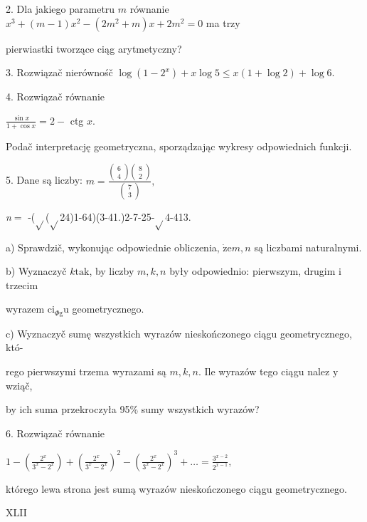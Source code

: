 \documentclass[a4paper,12pt]{article}
\begin{document}
2. Dla jakiego parametru $m$ równanie $x^{3}+(m-1)x^{2}-(2m^{2}+m)x+2m^{2}=0$ ma trzy

pierwiastki tworzące ciąg arytmetyczny?

3. Rozwiązač nierównośč $\log(1-2^{x})+x\log 5\leq x(1+\log 2)+\log 6.$

4. Rozwiązač równanie

$\displaystyle \frac{\sin x}{1+\cos x}=2-$ ctg $x.$

Podač interpretację geometryczna, sporządzając wykresy odpowiednich funkcji.

5. Dane są liczby: $m=\displaystyle \frac{\left(\begin{array}{l}
6\\
4
\end{array}\right)\left(\begin{array}{l}
8\\
2
\end{array}\right)}{\left(\begin{array}{l}
7\\
3
\end{array}\right)},$

{\it n}$=$ -($\sqrt{}$($\sqrt{}$24)1-64)(3-41.)2-7-25-$\sqrt{}$4-413.

a) Sprawdzič, wykonując odpowiednie obliczenia, $\dot{\mathrm{z}}\mathrm{e}m, n$ są liczbami naturalnymi.

b) Wyznaczyč $k\mathrm{t}\mathrm{a}\mathrm{k}$, by liczby $m, k, n$ były odpowiednio: pierwszym, drugim $\mathrm{i}$ trzecim

wyrazem $\mathrm{c}\mathrm{i}_{\Phi \mathrm{g}}\mathrm{u}$ geometrycznego.

c) Wyznaczyč sumę wszystkich wyrazów nieskończonego ciągu geometrycznego, któ-

rego pierwszymi trzema wyrazami są $m, k, n$. Ile wyrazów tego ciągu nalez $\mathrm{y}$ wziąč,

by ich suma przekroczyła 95\% sumy wszystkich wyrazów?

6. Rozwiązač równanie

$1-(\displaystyle \frac{2^{x}}{3^{x}-2^{x}})+(\frac{2^{x}}{3^{x}-2^{x}})^{2}-(\frac{2^{x}}{3^{x}-2^{x}})^{3}+\ldots=\frac{3^{x-2}}{2^{x-1}},$

którego lewa strona jest sumą wyrazów nieskończonego ciągu geometrycznego.







XLII
\end{document}
